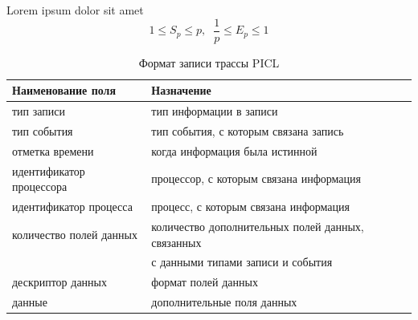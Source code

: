 Lorem ipsum dolor sit amet
\begin{equation}
1\leq S_{p} \leq p,\; \;  \frac{1}{p} \leq E_{p} \leq 1
\label{F:103}
\end{equation}



\begin{table}[h!]
	\caption{\label{tab:tbl1}Формат записи трассы PICL}
	\begin{tabular}{|l|l|}
		\hline
		Наименование поля & Назначение \\
		\hline\hline
		тип записи&тип информации в записи
		\\\hline
		тип события &тип события, с которым связана запись
		\\\hline
		отметка времени&когда информация была истинной\\\hline
		идентификатор процессора
		&процессор, с которым связана информация
		\\\hline
		идентификатор процесса	
		&процесс, с которым связана информация	
		\\\hline
		количество полей данных	
		&количество дополнительных полей данных, связанных \tabularnewline & с данными типами записи и события	
		\\\hline
		дескриптор данных	
		&формат полей данных
		\\\hline
		данные	
		&дополнительные поля данных
		\\\hline
		
	\end{tabular}
\end{table}

